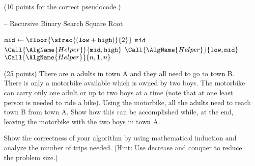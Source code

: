 \documentclass[final]{article}
\begin{document}
\begin{solution}\mbox{}
(10 points for the correct pseudocode.)
    \begin{algorithm}[H]
        \caption[]{ -- Recursive Binary Search Square Root}
        \label{alg:recbinsqrt}
        \begin{algorithmic}[1]
             
            \State $\texttt{mid} \gets \floor{\sfrac{(\texttt{low} + \texttt{high})}{2}}$   
            \State \Return $\texttt{mid}$
             
            \State \Return $\Call{\AlgName{Helper}}{\texttt{mid},\texttt{high}}$
            \Else {}
            \State \Return $\Call{\AlgName{Helper}}{\texttt{low}, \texttt{mid}}$
            \EndIf
            \EndFunction
            \State \Return $\Call{\AlgName{Helper}}{n, 1, n}$
            \EndFunction
        \end{algorithmic}
    \end{algorithm}
\end{solution}

\begin{exercise}{2.9} (25 points)
    There are $n$ adults in town A and they all need to go to town B. There is only a motorbike available which is owned by two boys.
    The motorbike can carry only one adult or up to two boys at a time (note that at one least person is needed to ride a bike). Using the motorbike, all the adults need to reach town B from town A.
    Show how this can be accomplished while, at the end, leaving the motorbike with the two boys in town A.

    Show the correctness of your algorithm by using mathematical induction and analyze the number of trips needed. (Hint: Use decrease and conquer to reduce the problem size.)
\end{exercise}
\end{document}
